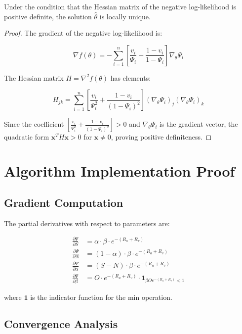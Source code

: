 \documentclass[11pt]{article}
\begin{document}
\begin{theorem}
Under the condition that the Hessian matrix of the negative log-likelihood is positive definite, the solution $\hat{\theta}$ is locally unique.
\end{theorem}

\begin{proof}
The gradient of the negative log-likelihood is:

\[
\nabla f(\theta) = -\sum_{i=1}^n \left[ \frac{v_i}{\Psi_i} - \frac{1-v_i}{1-\Psi_i} \right] \nabla_\theta \Psi_i
\]

The Hessian matrix $H = \nabla^2 f(\theta)$ has elements:

\[
H_{jk} = \sum_{i=1}^n \left[ \frac{v_i}{\Psi_i^2} + \frac{1-v_i}{(1-\Psi_i)^2} \right] (\nabla_\theta \Psi_i)_j (\nabla_\theta \Psi_i)_k
\]

Since the coefficient $\left[ \frac{v_i}{\Psi_i^2} + \frac{1-v_i}{(1-\Psi_i)^2} \right] > 0$ and $\nabla_\theta \Psi_i$ is the gradient vector, the quadratic form $\mathbf{x}^T H \mathbf{x} > 0$ for $\mathbf{x} \neq 0$, proving positive definiteness.
\end{proof}

\section{Algorithm Implementation Proof}

\subsection{Gradient Computation}

The partial derivatives with respect to parameters are:

\begin{align*}
\frac{\partial \Psi}{\partial S} &= \alpha \cdot \beta \cdot e^{-(R_a + R_v)} \\
\frac{\partial \Psi}{\partial N} &= (1-\alpha) \cdot \beta \cdot e^{-(R_a + R_v)} \\
\frac{\partial \Psi}{\partial \alpha} &= (S - N) \cdot \beta \cdot e^{-(R_a + R_v)} \\
\frac{\partial \Psi}{\partial \beta} &= O \cdot e^{-(R_a + R_v)} \cdot \mathbf{1}_{\beta O e^{-(R_a + R_v)} < 1}
\end{align*}

where $\mathbf{1}$ is the indicator function for the min operation.

\subsection{Convergence Analysis}
\end{document}
